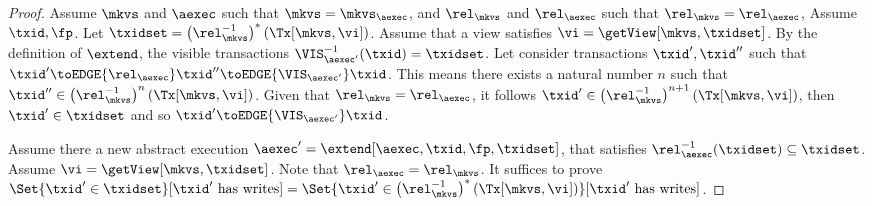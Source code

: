\begin{proof}
    Assume \( \mkvs \) and \( \aexec \) such that \( \mkvs = \mkvs_\aexec \), 
    and \( \rel_\mkvs \) and \( \rel_\aexec \) such that \( \rel_\mkvs = \rel_\aexec \),
    Assume \(\txid, \fp \).
    Let \( \txidset  =  \left(\rel_\mkvs^{-1}\right)^{*}(\Tx[\mkvs,\vi]) \).
    Assume that a view satisfies \( \vi = \getView[\mkvs,\txidset] \).
    By the definition of \( \extend \),  the visible transactions 
    \( \VIS_{\aexec'}^{-1}(\txid) = \txidset \).
    Let consider transactions \( \txid', \txid'' \) such that \( \txid' \toEDGE{\rel_{\aexec}} \txid'' \toEDGE{\VIS_{\aexec'}} \txid \).
    This means there exists a natural number \( n \) such that 
    \( \txid'' \in \left(\rel_\mkvs^{-1}\right)^{n}(\Tx[\mkvs,\vi])\).
    Given that \( \rel_\mkvs = \rel_\aexec \), it follows \( \txid' \in \left(\rel_\mkvs^{-1}\right)^{n + 1}(\Tx[\mkvs,\vi])\), 
    then \( \txid' \in \txidset \) and so \( \txid' \toEDGE{\VIS_{\aexec'}} \txid \).

    Assume there a new abstract execution \( \aexec' = \extend[\aexec, \txid, \fp, \txidset] \),
    that satisfies \( \rel_\aexec^{-1}(\txidset) \subseteq \txidset \).
    Assume \( \vi = \getView[\mkvs,\txidset] \).
    Note that \( \rel_\aexec = \rel_\mkvs \).
    It suffices to prove
    \( \Set{\txid' \in \txidset }[\txid' \ \text{has writes}] = \Set{ \txid' \in \left(\rel_\mkvs^{-1}\right)^{*}(\Tx[\mkvs,\vi]) }[\txid' \ \text{has writes}]\).


\end{proof}
